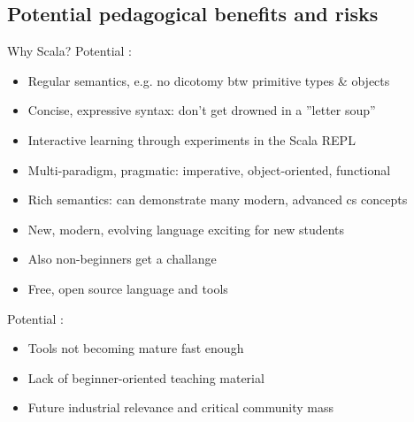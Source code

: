 \documentclass{lecturenotes}
\begin{document}
\subsection[Potential pedagogical benefits and risks]{Potential pedagogical benefits and risks}

\begin{Slide}{Why Scala?}
Potential :
\begin{itemize}\fontsize{9}{10}\selectfont
\item Regular semantics, e.g. no dicotomy btw primitive types \& objects
\item Concise, expressive syntax: don't get drowned in a ''letter soup''
\item Interactive learning through experiments in the Scala REPL
\item Multi-paradigm, pragmatic: imperative, object-oriented, functional
\item Rich semantics: can demonstrate many modern, advanced cs concepts
\item New, modern, evolving language exciting for new students
\item Also non-beginners get a challange 
\item Free, open source language and tools
\end{itemize}
Potential :
\begin{itemize}\fontsize{9}{10}\selectfont
\item Tools not becoming mature fast enough  
\item Lack of beginner-oriented teaching material
\item Future industrial relevance and critical community mass
\end{itemize}
\end{Slide}
\end{document}
